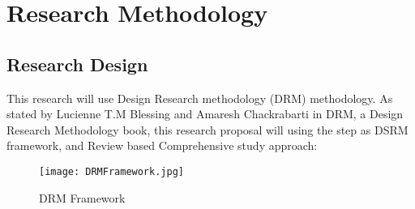 \chapter{Research Methodology}
\section{Research Design}
\label{sec:ResearchDesign}
This research will use Design Research methodology (DRM) methodology. As stated by Lucienne T.M Blessing and Amaresh Chackrabarti in DRM, a Design Research Methodology book, this research proposal will using the step as DSRM framework, and Review based Comprehensive study approach:
\begin{figure}[H]
	\centering
    \texttt{[image: DRMFramework.jpg]}
        \caption{DRM Framework\cite{DRM.Framework}}
        \label{fig:DRM.Framework}
\end{figure}\par

